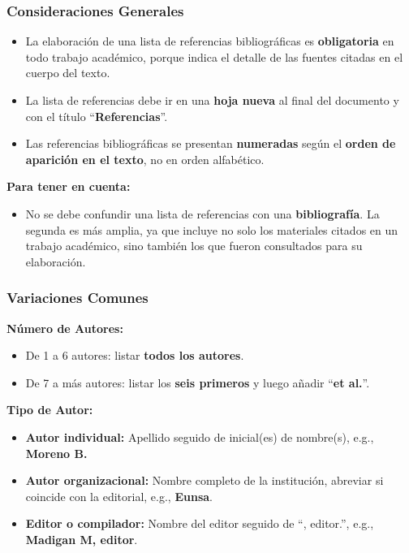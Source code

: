 \documentclass[
11pt, %
]{beamer}
\begin{document}
\begin{frame}
	\frametitle{Consideraciones Generales}

	\begin{itemize}
		\item La elaboración de una lista de referencias bibliográficas es \textbf{obligatoria} en todo trabajo académico, porque indica el detalle de las fuentes citadas en el cuerpo del texto.
		\item La lista de referencias debe ir en una \textbf{hoja nueva} al final del documento y con el título “\textbf{Referencias}”.
		\item Las referencias bibliográficas se presentan \textbf{numeradas} según el \textbf{orden de aparición en el texto}, no en orden alfabético.
	\end{itemize}

	\textbf{Para tener en cuenta:}
	\begin{itemize}
		\item No se debe confundir una lista de referencias con una \textbf{bibliografía}. La segunda es más amplia, ya que incluye no solo los materiales citados en un trabajo académico, sino también los que fueron consultados para su elaboración.
	\end{itemize}

\end{frame}

\begin{frame}
	\frametitle{Variaciones Comunes}

	\textbf{Número de Autores:}
	\begin{itemize}
		\item De 1 a 6 autores: listar \textbf{todos los autores}.
		\item De 7 a más autores: listar los \textbf{seis primeros} y luego añadir “\textbf{et al.}”.
	\end{itemize}

	\textbf{Tipo de Autor:}
	\begin{itemize}
		\item \textbf{Autor individual:} Apellido seguido de inicial(es) de nombre(s), e.g., \textbf{Moreno B.}
		\item \textbf{Autor organizacional:} Nombre completo de la institución, abreviar si coincide con la editorial, e.g., \textbf{Eunsa}.
		\item \textbf{Editor o compilador:} Nombre del editor seguido de “, editor.”, e.g., \textbf{Madigan M, editor}.
	\end{itemize}

\end{frame}
\end{document}
